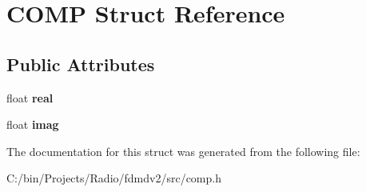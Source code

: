 \hypertarget{struct_c_o_m_p}{\section{C\-O\-M\-P Struct Reference}
\label{struct_c_o_m_p}
}
\subsection*{Public Attributes}
\begin{DoxyCompactItemize}
\item 
\hypertarget{struct_c_o_m_p_aab5da66c35473e59242b301dafdfaf7e}{float {\bfseries real}}\label{struct_c_o_m_p_aab5da66c35473e59242b301dafdfaf7e}

\item 
\hypertarget{struct_c_o_m_p_a8c292c732f8928c23921da6512699bba}{float {\bfseries imag}}\label{struct_c_o_m_p_a8c292c732f8928c23921da6512699bba}

\end{DoxyCompactItemize}


The documentation for this struct was generated from the following file\-:\begin{DoxyCompactItemize}
\item 
C\-:/bin/\-Projects/\-Radio/fdmdv2/src/comp.\-h\end{DoxyCompactItemize}
